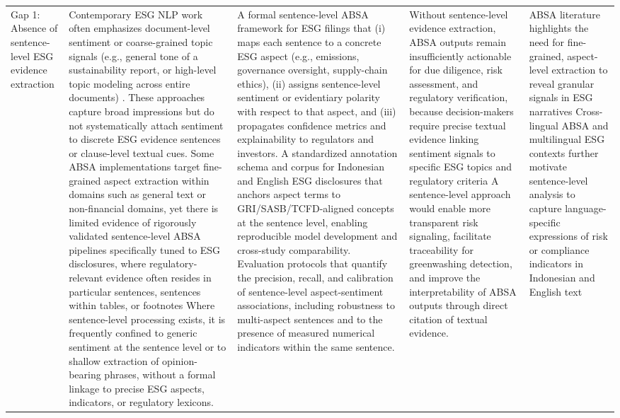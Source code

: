 \begin{landscape}
\begin{longtable}{p{2cm} p{8cm} p{7cm} p{4cm} p{4cm}}
Gap 1: Absence of sentence-level ESG evidence extraction & Contemporary ESG NLP work often emphasizes document-level sentiment or coarse-grained topic signals (e.g., general tone of a sustainability report, or high-level topic modeling across entire documents) \cite{10.3390/su14159165,10.3390/su15054134,10.69593/ajbais.v4i04.130,10.1111/eufm.12509}. These approaches capture broad impressions but do not systematically attach sentiment to discrete ESG evidence sentences or clause-level textual cues. Some ABSA implementations target fine-grained aspect extraction within domains such as general text or non-financial domains, yet there is limited evidence of rigorously validated sentence-level ABSA pipelines specifically tuned to ESG disclosures, where regulatory-relevant evidence often resides in particular sentences, sentences within tables, or footnotes \cite{10.1002/csr.70089,10.3390/math12193119,10.2139/ssrn.3738629,10.1111/eufm.12509} Where sentence-level processing exists, it is frequently confined to generic sentiment at the sentence level or to shallow extraction of opinion-bearing phrases, without a formal linkage to precise ESG aspects, indicators, or regulatory lexicons. & A formal sentence-level ABSA framework for ESG filings that (i) maps each sentence to a concrete ESG aspect (e.g., emissions, governance oversight, supply-chain ethics), (ii) assigns sentence-level sentiment or evidentiary polarity with respect to that aspect, and (iii) propagates confidence metrics and explainability to regulators and investors. A standardized annotation schema and corpus for Indonesian and English ESG disclosures that anchors aspect terms to GRI/SASB/TCFD-aligned concepts at the sentence level, enabling reproducible model development and cross-study comparability. Evaluation protocols that quantify the precision, recall, and calibration of sentence-level aspect-sentiment associations, including robustness to multi-aspect sentences and to the presence of measured numerical indicators within the same sentence. & Without sentence-level evidence extraction, ABSA outputs remain insufficiently actionable for due diligence, risk assessment, and regulatory verification, because decision-makers require precise textual evidence linking sentiment signals to specific ESG topics and regulatory criteria \cite{10.1002/csr.70089,10.1108/mf-01-2023-0020,10.1111/eufm.12509} A sentence-level approach would enable more transparent risk signaling, facilitate traceability for greenwashing detection, and improve the interpretability of ABSA outputs through direct citation of textual evidence. & ABSA literature highlights the need for fine-grained, aspect-level extraction to reveal granular signals in ESG narratives \cite{10.1002/csr.70089,10.3390/math12193119,10.2139/ssrn.3738629,10.1111/eufm.12509} Cross-lingual ABSA and multilingual ESG contexts further motivate sentence-level analysis to capture language-specific expressions of risk or compliance indicators in Indonesian and English text \cite{10.1016/j.inffus.2025.103073,10.1111/eufm.12509,10.48550/arxiv.2511.00024} \\

\end{longtable}
\end{landscape}
